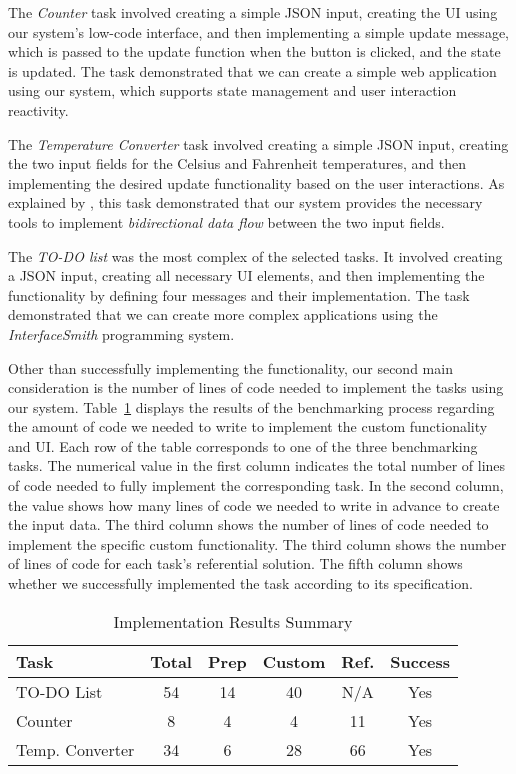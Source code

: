 The \emph{Counter} task involved creating a simple JSON input, creating the UI using our system's low-code interface, and then implementing a simple update message,
which is passed to the update function when the button is clicked, and the state is updated.
The task demonstrated that we can create a simple web application using our system, which supports state management and user interaction reactivity.

The \emph{Temperature Converter} task involved creating a simple JSON input, creating the two input fields for the Celsius and Fahrenheit temperatures, and then implementing the desired update functionality based on the user
interactions. As explained by \citet{7GUIs-web}, this task demonstrated that our system provides the necessary tools to implement \emph{bidirectional data flow} between the two input fields.

The \emph{TO-DO list} was the most complex of the selected tasks. It involved creating a JSON input, creating all necessary UI elements, and then implementing the functionality by defining four messages and their implementation.
The task demonstrated that we can create more complex applications using the \emph{InterfaceSmith} programming system.

Other than successfully implementing the functionality, our second main consideration is the number of lines of code needed to implement the tasks using our system.
Table~\ref{tab:results} displays the results of the benchmarking process regarding the amount of code we needed to write to implement the custom functionality and UI.
Each row of the table corresponds to one of the three benchmarking tasks.
The numerical value in the first column indicates the total number of lines of code needed to fully implement the corresponding task.
In the second column, the value shows how many lines of code we needed to write in advance to create the input data.
The third column shows the number of lines of code needed to implement the specific custom functionality.
The third column shows the number of lines of code for each task's referential solution.
The fifth column shows whether we successfully implemented the task according to its specification.


\begin{table}[htbp]
	\centering
	\begin{tabular}{|p{3cm}|c|c|c|c|c|}
		\hline
		\textbf{Task}   & \textbf{Total} & \textbf{Prep} & \textbf{Custom} & \textbf{Ref.} & \textbf{Success} \\
		\hline
		TO-DO List      & 54             & 14            & 40              & N/A           & Yes              \\
		Counter         & 8              & 4             & 4               & 11            & Yes              \\
		Temp. Converter & 34             & 6             & 28              & 66            & Yes              \\
		\hline
	\end{tabular}
	\caption{Implementation Results Summary}
	\label{tab:results}
\end{table}


